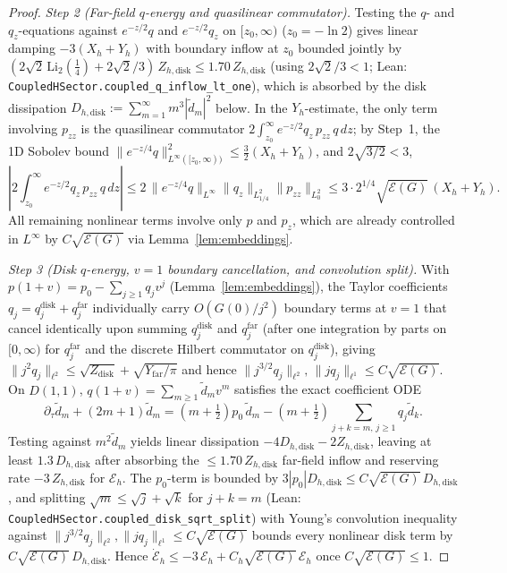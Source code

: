 \documentclass[11pt,a4paper]{article}
\begin{document}
\begin{proof}
\emph{Step 2 (Far-field $q$-energy and quasilinear commutator).}
Testing the $q$- and $q_z$-equations against $e^{-z/2}q$ and $e^{-z/2}q_z$ on $[z_0,\infty)$ ($z_0=-\ln 2$)
gives linear damping $-3(X_h+Y_h)$ with boundary inflow at $z_0$ bounded jointly by
$(2\sqrt{2}\,\mathrm{Li}_2(\tfrac14) + 2\sqrt{2}/3)\,Z_{h,\mathrm{disk}} \le 1.70\,Z_{h,\mathrm{disk}}$
(using $2\sqrt{2}/3 < 1$; Lean: \texttt{CoupledHSector.\allowbreak coupled\_q\_inflow\_lt\_one}), which is absorbed by
the disk dissipation $D_{h,\mathrm{disk}} := \sum_{m=1}^\infty m^3|\tilde{d}_m|^2$ below.
In the $Y_h$-estimate, the only term involving $p_{zz}$ is the quasilinear commutator
$2\int_{z_0}^\infty e^{-z/2} q_z\, p_{zz}\, q\,dz$; by Step~1, the 1D Sobolev bound
$\|e^{-z/4}q\|_{L^\infty([z_0,\infty))}^2 \le \tfrac32(X_h + Y_h)$, and $2\sqrt{3/2} < 3$,
\[
\left|2\int_{z_0}^\infty e^{-z/2} q_z\, p_{zz}\, q\,dz\right|
  \le 2\,\|e^{-z/4}q\|_{L^\infty}\|q_z\|_{L^2_{1/4}}\|p_{zz}\|_{L^2_0}
  \le 3\cdot 2^{1/4}\sqrt{\mathcal{E}(G)}\,(X_h + Y_h).
\]
All remaining nonlinear terms involve only $p$ and $p_z$, which are already controlled in $L^\infty$
by $C\sqrt{\mathcal{E}(G)}$ via Lemma~\ref{lem:embeddings}.

\emph{Step 3 (Disk $q$-energy, $v=1$ boundary cancellation, and convolution split).}
With $p(1+v) = p_0 - \sum_{j\ge 1} q_j v^j$ (Lemma~\ref{lem:embeddings}), the Taylor coefficients
$q_j = q_j^{\mathrm{disk}} + q_j^{\mathrm{far}}$ individually carry $O(G(0)/j^2)$ boundary terms at $v=1$
that cancel identically upon summing $q_j^{\mathrm{disk}}$ and $q_j^{\mathrm{far}}$ (after one integration by parts
on $[0,\infty)$ for $q_j^{\mathrm{far}}$ and the discrete Hilbert commutator on $q_j^{\mathrm{disk}}$), giving
$\|j^2 q_j\|_{\ell^2} \le \sqrt{Z_{\mathrm{disk}}} + \sqrt{Y_{\mathrm{far}}/\pi}$ and hence
$\|j^{3/2} q_j\|_{\ell^2},\, \|j q_j\|_{\ell^1} \le C\sqrt{\mathcal{E}(G)}$.
On $D(1,1)$, $q(1+v)=\sum_{m\ge 1}\tilde{d}_m v^m$ satisfies the exact coefficient ODE
\[
\partial_\tau\tilde{d}_m + (2m+1)\tilde{d}_m
  = (m+\tfrac12)p_0\,\tilde{d}_m - (m+\tfrac12)\sum_{j+k=m,\,j\ge 1} q_j\tilde{d}_k.
\]
Testing against $m^2\tilde{d}_m$ yields linear dissipation $-4 D_{h,\mathrm{disk}} - 2 Z_{h,\mathrm{disk}}$,
leaving at least $1.3\,D_{h,\mathrm{disk}}$ after absorbing the $\le 1.70\,Z_{h,\mathrm{disk}}$ far-field
inflow and reserving rate $-3\,Z_{h,\mathrm{disk}}$ for $\mathcal{E}_h$.
The $p_0$-term is bounded by $3|p_0| D_{h,\mathrm{disk}} \le C\sqrt{\mathcal{E}(G)}\,D_{h,\mathrm{disk}}$,
and splitting $\sqrt{m}\le\sqrt{j}+\sqrt{k}$ for $j+k=m$
(Lean: \texttt{CoupledHSector.\allowbreak coupled\_disk\_sqrt\_split}) with Young's convolution inequality against
$\|j^{3/2}q_j\|_{\ell^2}, \|j q_j\|_{\ell^1} \le C\sqrt{\mathcal{E}(G)}$ bounds every nonlinear disk
term by $C\sqrt{\mathcal{E}(G)}\,D_{h,\mathrm{disk}}$.  Hence
$\dot{\mathcal{E}}_h \le -3\,\mathcal{E}_h + C_h\sqrt{\mathcal{E}(G)}\,\mathcal{E}_h$ once
$C\sqrt{\mathcal{E}(G)} \le 1$.


\end{proof}
\end{document}
